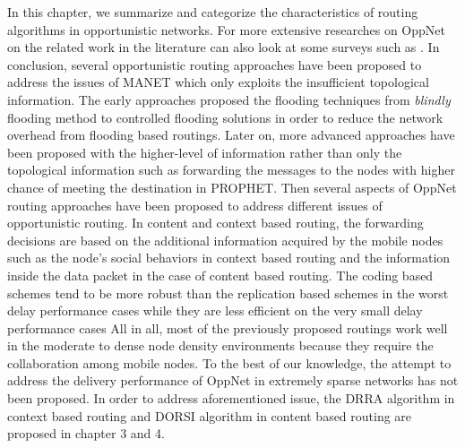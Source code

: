 In this chapter, we summarize and categorize the characteristics of routing algorithms in opportunistic networks.
For more extensive researches on OppNet on the related work in the literature can also look at some surveys such as \cite{Yue2013, Souza2010, Poonguzharselvi2013a, Nousiainen2013, Behrouz2013, Wahid2014}.
In conclusion, several opportunistic routing approaches have been proposed to address the issues of MANET which only exploits the insufficient topological information.
The early approaches proposed the flooding techniques from \emph{blindly} flooding method to controlled flooding solutions in order to reduce the network overhead from flooding based routings.
Later on, more advanced approaches have been proposed with the higher-level of information rather than only the topological information such as forwarding the messages to the nodes with higher chance of meeting the destination in PROPHET.
Then several aspects of OppNet routing approaches have been proposed to address different issues of opportunistic routing.
In content and context based routing, the forwarding decisions are based on the additional information acquired by the mobile nodes such as the node's social behaviors in context based routing and the information inside the data packet in the case of content based routing. 
The coding based schemes tend to be more robust than the replication based schemes in the worst delay performance cases while they are less efficient on the very small delay performance cases
All in all, most of the previously proposed routings work well in the moderate to dense node density environments because they require the collaboration among mobile nodes.
To the best of our knowledge, the attempt to address the delivery performance of OppNet in extremely sparse networks has not been proposed.
In order to address aforementioned issue, the DRRA algorithm in context based routing and DORSI algorithm in content based routing are proposed in chapter 3 and 4.





























